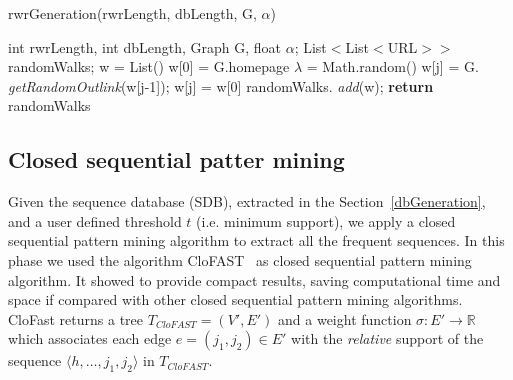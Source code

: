 \begin{algorithm}[tb]
\caption{rwrGeneration(rwrLength, dbLength, G, $\alpha$)}
\label{3alg:datasetGeneration}
\begin{algorithmic}[1]
\renewcommand{\algorithmicrequire}{\textbf{Input:}}
\newcommand{\RETURN}[1]{\textbf{return} #1}
\renewcommand{\algorithmicensure}{\textbf{Output:}}
\renewcommand{\algorithmiccomment}[1]{$//$ \textit{#1}}
\renewcommand{\algorithmicforall}{\textbf{for each}}
\newcommand{\getRandomVertex}[1]{ \textit{getRandomVertex}(#1); }
\newcommand{\getNextRandomVertex}[1]{ \textit{getRandomOutlink}(#1); }
\newcommand{\add}[1]{ \textit{add}(#1); }

\REQUIRE int rwrLength, int dbLength, Graph G, float $\alpha$;
\ENSURE List$<$List$<$URL$>>$ randomWalks;
	    \STATE w = List()
	    \STATE w[0] = G.homepage
		\STATE $\lambda$ = Math.random()
		\IF{$\lambda > \alpha$}
		\STATE w[j] = G.\getNextRandomVertex{w[j-1]}
		\ELSE 
		\STATE w[j] = w[0]
		\ENDIF
		\ENDFOR
		\STATE randomWalks.\add{w}
 	\ENDFOR
\RETURN randomWalks

\end{algorithmic}
\end{algorithm}
  

\subsection{Closed sequential patter mining}
Given the sequence database (SDB), extracted in the Section~\ref{dbGeneration}, and a user defined threshold $t$ (i.e. minimum support), we apply a closed sequential pattern mining algorithm to extract all the frequent sequences. In this phase we used the algorithm CloFAST~\cite{Fumarola:2015} as closed sequential pattern mining algorithm. It  showed to provide compact results, saving computational time and space if compared with other closed sequential pattern mining algorithms.
CloFast returns a tree $T_{CloFAST} = (V', E')$ and a weight function $\sigma : E' \rightarrow \mathbb{R} $ which associates each edge $e=(j_1,j_2)\in E'$  with the \textit{relative} support of the sequence $\langle h, \ldots, j_1,j_2\rangle$ in $T_{CloFAST}$.

